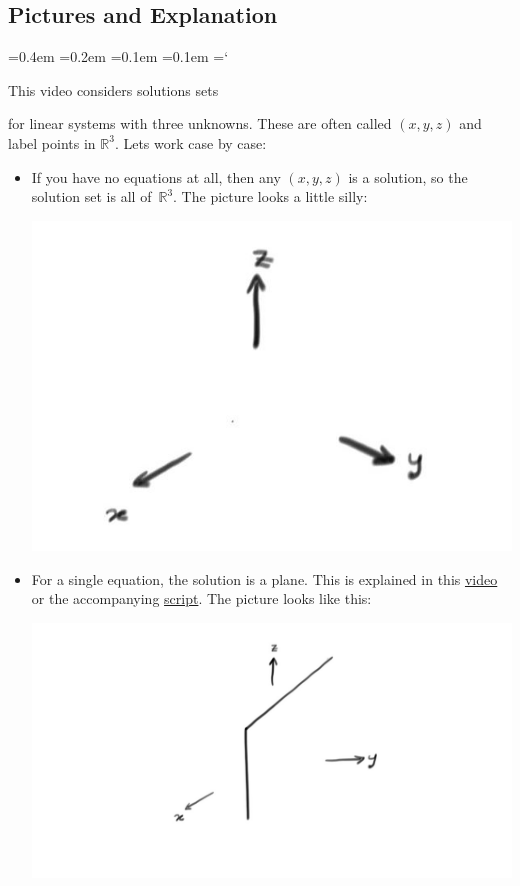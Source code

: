 
\subsection*{Pictures and Explanation}

{\ttfamily
{}\font=0.4em
\font=0.2em
\font=0.1em
\font=0.1em
\hyphenchar\font=`\-


\hypertarget{solution_sets_for_systems_of_linear_equations_overview}{This video considers solutions sets}
for linear systems with three unknowns. These are often called $(x,y,z)$ and label points in ${\mathbb R}^3$.
Lets work case by case:

\begin{itemize}
\item If you have no equations at all, then any $(x,y,z)$ is a solution, so the solution set is  all of~${\mathbb R}^3$.
The picture looks a little silly:
\begin{center}
\includegraphics[alt={Three basis vectors x, y, and z.},scale=.15]{all_of_R3.jpg}
\end{center}
\item For a single equation, the solution is a plane. This is explained in this \href{\videourl solution_sets_for_systems_of_linear_equations_planes.mp4}{video}
or the accompanying \hyperlink{solution_sets_for_systems_of_linear_equations_planes}{script}. The picture looks like this:
\begin{center}
\includegraphics[alt={A plane in three dimensions, which is difficult to draw.},scale=.18]{plane_in_R3.jpg}

\end{center}
\end{itemize}}
